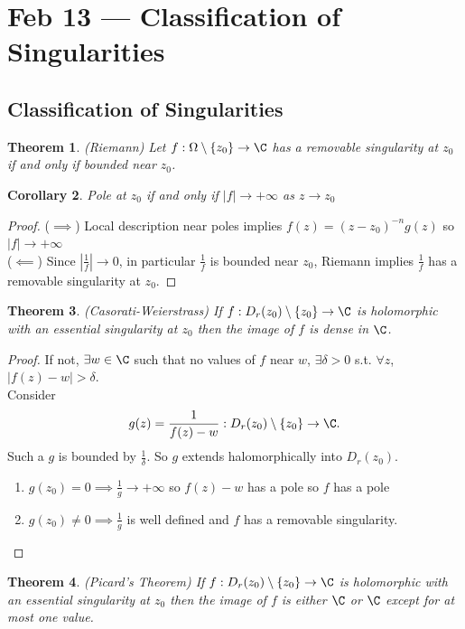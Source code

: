 \documentclass[a4paper]{article}
\newtheorem{thm}{Theorem}[section]
\newtheorem{cor}[thm]{Corollary}
\begin{document}
\section{Feb 13 --- Classification of Singularities}
\subsection{Classification of Singularities}
\begin{thm}
    (Riemann) Let $f:\Omega\setminus \{z_0\}\to \C$ has a removable singularity at $z_0$ if and only if bounded near $z_0$. 
\end{thm}
\begin{cor}
    Pole at $z_0$ if and only if $|f|\to +\infty$ as $z\to z_0$
\end{cor}
\begin{proof}
    ($\implies$) Local description near poles implies $f(z)=(z-z_0)^{-n}g(z)$ so $|f|\to +\infty$\\
    ($\impliedby$) Since $\left | \frac{1}{f}\right | \to 0$, in particular $\frac{1}{f}$ is bounded near $z_0$, Riemann implies $\frac{1}{f}$ has a removable singularity at $z_0.$ 
\end{proof}
\begin{thm}
    (Casorati-Weierstrass) If $f:D_r(z_0)\setminus \{z_0\}\to \C$ is holomorphic with an essential singularity at $z_0$ then the image of $f$ is dense in $\C$.
\end{thm}
\begin{proof}
    If not, $\exists w\in \C$ such that no values of $f$ near $w$, $\exists \delta>0$ s.t. $\forall z$, $|f(z)-w|>\delta.$ \\
    Consider \[
    g(z)=\frac{1}{f(z)-w}:D_r(z_0)\setminus \{z_0\}\to \C
    .\] 
    Such a $g$ is bounded by $\frac{1}{\delta}$. So $g$ extends halomorphically into $D_r(z_0).$ 
    \begin{enumerate}
        \item[(Case 1)] $g(z_0)=0\implies \frac{1}{g}\to +\infty$ so $f(z)-w$ has a pole so $f$ has a pole
        \item[(Case 2)] $g(z_0)\neq 0\implies \frac{1}{g}$ is well defined and $f$ has a removable singularity. 
    \end{enumerate}
\end{proof}
\begin{thm}
    (Picard's Theorem) If $f:D_r(z_0)\setminus \{z_0\}\to \C$ is holomorphic with an essential singularity at $z_0$ then the image of $f$ is either $\C$ or $\C$ except for at most one value. 
\end{thm}
\end{document}

